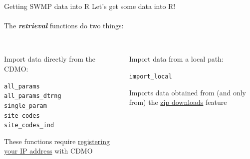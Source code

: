 \documentclass[xcolor=dvipsnames,serif]{beamer}\usepackage[]{graphicx}\usepackage[]{color}
\makeatletter
\newcommand{\hlstd}[1]{\textcolor[rgb]{0.345,0.345,0.345}{#1}}%
\newenvironment{kframe}{%
 \def\at@end@of@kframe{}%
 \ifinner\ifhmode%
  \def\at@end@of@kframe{\end{minipage}}%
  \begin{minipage}{\columnwidth}%
 \fi\fi%
 \def\FrameCommand##1{\hskip\@totalleftmargin \hskip-\fboxsep
 \colorbox{shadecolor}{##1}\hskip-\fboxsep
     \hskip-\linewidth \hskip-\@totalleftmargin \hskip\columnwidth}%
 \MakeFramed {\advance\hsize-\width
   \@totalleftmargin\z@ \linewidth\hsize
   \@setminipage}}%
 {\par\unskip\endMakeFramed%
 \at@end@of@kframe}
\newenvironment{knitrout}{}{} %
\newcommand{\Bigtxt}[1]{\textbf{\textit{#1}}}
\makeatother
\begin{document}
\begin{frame}[fragile]{Getting SWMP data into R}
Let's get some data into R!\\~\\
The \Bigtxt{retrieval} functions do two things: \\~\\
\begin{columns}[t]
\begin{column}{0.4\textwidth}
Import data directly from the CDMO:
\begin{knitrout}\scriptsize
{}\color{fgcolor}\begin{kframe}
\begin{alltt}
\hlstd{all_params}
\hlstd{all_params_dtrng}
\hlstd{single_param}
\hlstd{site_codes}
\hlstd{site_codes_ind}
\end{alltt}
\end{kframe}
\end{knitrout}
These functions require \href{http://cdmo.baruch.sc.edu/webservices.cfm}{registering your IP address}  with CDMO
\end{column}
\begin{column}{0.4\textwidth}
Import data from a local path:
\begin{knitrout}\scriptsize
{}\color{fgcolor}\begin{kframe}
\begin{alltt}
\hlstd{import_local}
\end{alltt}
\end{kframe}
\end{knitrout}
Imports data obtained from (and only from) the \href{http://cdmo.baruch.sc.edu/aqs/zips.cfm}{zip downloads} feature
\end{column}
\end{columns}
\end{frame}
\end{document}
